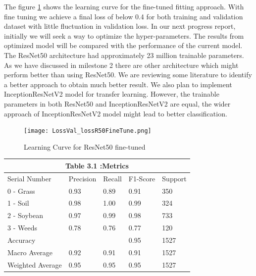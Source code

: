 \documentclass{report}
\begin{document}
The figure \ref{fig:Fine-Tuned} shows the learning curve for the fine-tuned fitting approach. With fine tuning we achieve a final loss of below 0.4 for both training and validation dataset with little fluctuation in validation loss.  In our next progress report, initially we will seek a way to optimize the hyper-parameters. The results from optimized model will be compared with the performance of the current model. The ResNet50 architecture had approximately 23 million trainable parameters. As we have discussed in milestone 2 there are other architecture which might perform better than using ResNet50. We are reviewing some literature to identify a better approach to obtain much better result. We also plan to implement InceptionResNetV2  model for transfer learning. However, the trainable parameters in both ResNet50 and InceptionResNetV2 are equal, the wider approach of InceptionResNetV2  model might lead to better classification.
\begin{figure}[H]
    \centering
    \texttt{[image: LossVal\_lossR50FineTune.png]}
    \caption{Learning Curve for ResNet50 fine-tuned}
    \label{fig:Fine-Tuned}
\end{figure}




\hfill

\begin{tabular}[H]{ | p{3cm}||p{2cm}||p{2cm}||p{2cm}||p{2cm}|}
\hline
 \multicolumn{5}{|c|}{ Table 3.1 :Metrics }\\
 \hline
 Serial Number & Precision & Recall & F1-Score & Support\\
 \hline
 0 - Grass & 0.93 & 0.89 & 0.91 & 350 \\
 1 - Soil & 0.98 & 1.00 & 0.99 & 324\\
 2 - Soybean & 0.97 & 0.99 & 0.98 & 733\\
 3 - Weeds & 0.78 & 0.76 & 0.77 & 120 \\
 Accuracy &  &  & 0.95 & 1527\\
 Macro Average & 0.92 & 0.91 & 0.91 & 1527\\
 Weighted Average & 0.95 & 0.95 & 0.95 & 1527\\
 \hline

\end{tabular}
\end{document}
